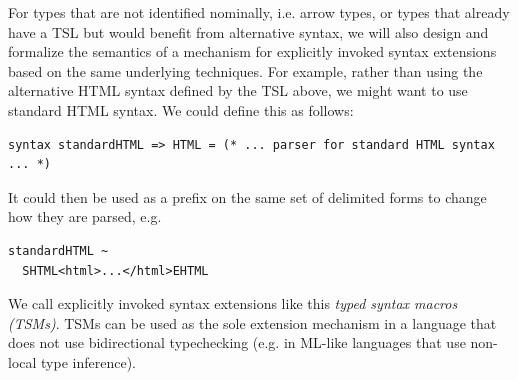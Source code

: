 \begin{contribution}\label{cont:TSMs}
For types that are not identified nominally, i.e. arrow types, or types that already have a TSL but would benefit from alternative syntax, we will also design and formalize the semantics of a mechanism for explicitly invoked syntax extensions based on the same underlying techniques. For example, rather than using the alternative HTML syntax defined by the TSL above, we might want to use standard HTML syntax. We could define this as follows:

\begin{lstlisting}[numbers=none]
syntax standardHTML => HTML = (* ... parser for standard HTML syntax ... *)
\end{lstlisting}
It could then be used as a prefix on the same set of delimited forms to change how they are parsed, e.g. 
\begin{lstlisting}[numbers=none]
standardHTML ~
  SHTML<html>...</html>EHTML
\end{lstlisting}

We call explicitly invoked syntax extensions like this \emph{typed syntax macros (TSMs)}. TSMs can be used as the sole extension mechanism in a language that does not use bidirectional typechecking (e.g. in ML-like languages that use non-local type inference).
\end{contribution}

